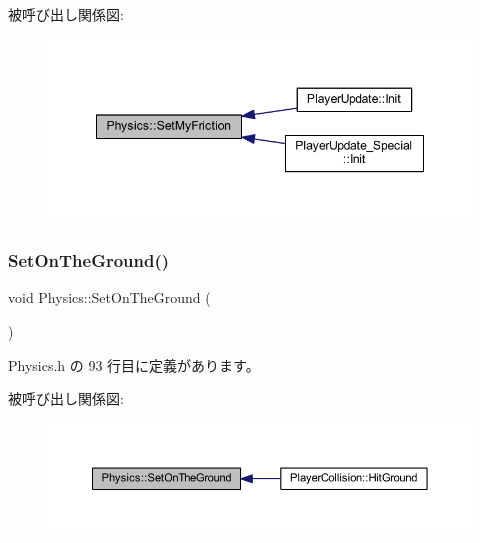 被呼び出し関係図\+:\nopagebreak
\begin{figure}[H]
\begin{center}
\leavevmode
\includegraphics[width=348pt]{class_physics_a0e3c9825aa4129a2212c1c61d0cd6ecb_icgraph}
\end{center}
\end{figure}
\mbox{\label{class_physics_a4e132f82ecc7f24200ec72213e2dc0c6}} 
\subsubsection{\texorpdfstring{Set\+On\+The\+Ground()}{SetOnTheGround()}}
{\footnotesize\ttfamily void Physics\+::\+Set\+On\+The\+Ground (\begin{DoxyParamCaption}{ }\end{DoxyParamCaption})\hspace{0.3cm}{\ttfamily [inline]}}



 Physics.\+h の 93 行目に定義があります。

被呼び出し関係図\+:\nopagebreak
\begin{figure}[H]
\begin{center}
\leavevmode
\includegraphics[width=350pt]{class_physics_a4e132f82ecc7f24200ec72213e2dc0c6_icgraph}
\end{center}
\end{figure}
\mbox{\label{class_physics_a13bf3e9de07a12afc3c0a4012e00d0a1}} 
